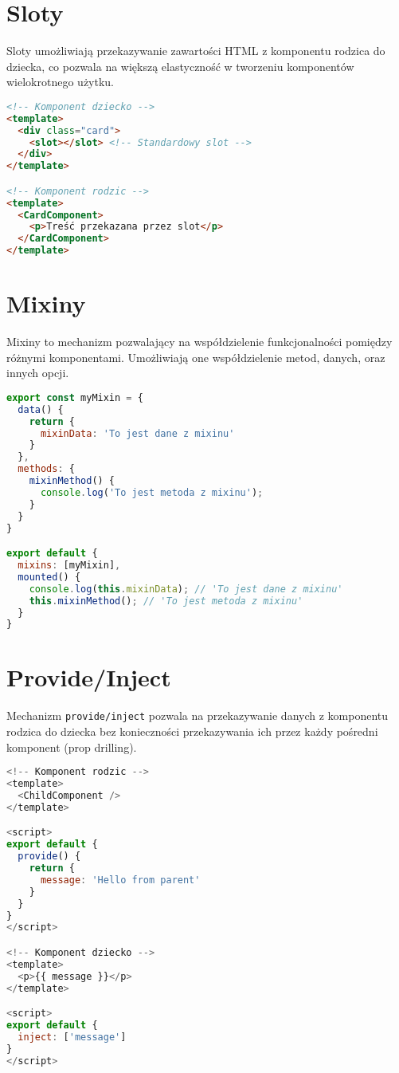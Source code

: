 \documentclass[a4paper,12pt]{article}
\begin{document}
\section{Sloty}
Sloty umożliwiają przekazywanie zawartości HTML z komponentu rodzica do dziecka, co pozwala na większą elastyczność w tworzeniu komponentów wielokrotnego użytku.

\begin{lstlisting}[language=HTML, caption=Przykład użycia slotów]
<!-- Komponent dziecko -->
<template>
  <div class="card">
    <slot></slot> <!-- Standardowy slot -->
  </div>
</template>

<!-- Komponent rodzic -->
<template>
  <CardComponent>
    <p>Treść przekazana przez slot</p>
  </CardComponent>
</template>
\end{lstlisting}

\section{Mixiny}
Mixiny to mechanizm pozwalający na współdzielenie funkcjonalności pomiędzy różnymi komponentami. Umożliwiają one współdzielenie metod, danych, oraz innych opcji.

\begin{lstlisting}[language=JavaScript, caption=Przykład użycia mixinów]
export const myMixin = {
  data() {
    return {
      mixinData: 'To jest dane z mixinu'
    }
  },
  methods: {
    mixinMethod() {
      console.log('To jest metoda z mixinu');
    }
  }
}

export default {
  mixins: [myMixin],
  mounted() {
    console.log(this.mixinData); // 'To jest dane z mixinu'
    this.mixinMethod(); // 'To jest metoda z mixinu'
  }
}
\end{lstlisting}

\section{Provide/Inject}
Mechanizm \texttt{provide/inject} pozwala na przekazywanie danych z komponentu rodzica do dziecka bez konieczności przekazywania ich przez każdy pośredni komponent (prop drilling).

\begin{lstlisting}[language=JavaScript, caption=Przykład użycia provide/inject]
<!-- Komponent rodzic -->
<template>
  <ChildComponent />
</template>

<script>
export default {
  provide() {
    return {
      message: 'Hello from parent'
    }
  }
}
</script>

<!-- Komponent dziecko -->
<template>
  <p>{{ message }}</p>
</template>

<script>
export default {
  inject: ['message']
}
</script>
\end{lstlisting}
\end{document}
